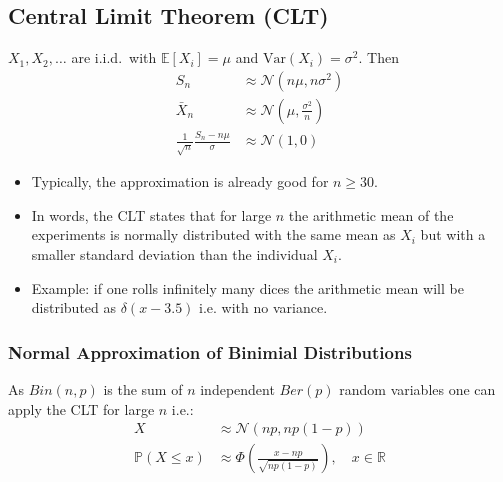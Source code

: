 \subsection{Central Limit Theorem (CLT)}
$X_1, X_2, \ldots$ are i.i.d.\ with $\mathbb{E}[X_i]=\mu$ and $\mathrm{Var}(X_i)=\sigma^2$. Then
\begin{align*}
    S_n                                       & \approx \mathcal{N}(n\mu, n\sigma^2)         \\
    \bar{X}_n                                 & \approx \mathcal{N}(\mu, \frac{\sigma^2}{n}) \\
    \frac{1}{\sqrt{n}}\frac{S_n-n\mu}{\sigma} & \approx\mathcal{N}(1,0)
\end{align*}


\begin{itemize}
    \item Typically, the approximation is already good for $n \geq 30$.
    \item In words, the CLT states that for large $n$ the arithmetic mean of the experiments is normally distributed with the same mean as $X_i$ but with a smaller standard deviation than the individual $X_i$.
    \item Example: if one rolls infinitely many dices the arithmetic mean will be distributed as $\delta(x-3.5)$ i.e. with no variance.
\end{itemize}
\subsubsection{Normal Approximation of Binimial Distributions}
As $Bin(n,p)$ is the sum of $n$ independent $Ber(p)$ random variables one can apply the CLT for large $n$ i.e.:
\begin{align*}
    X                   & \approx\mathcal{N}(np,np(1-p))                                           \\
    \mathbb{P}(X\leq x) & \approx\Phi\left(\frac{x-np}{\sqrt{np(1-p)}}\right),\quad x\in\mathbb{R}
\end{align*}